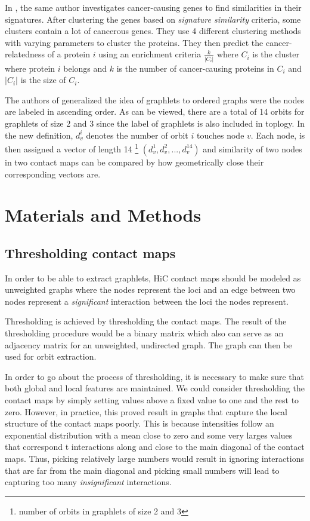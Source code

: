 \documentclass[a4,center,fleqn]{NAR}
\begin{document}
In \cite{milenkovic2010cancer}, the same author investigates 
cancer-causing genes to find similarities in their signatures. After
clustering the genes based on \textit{signature similarity} criteria,
some clusters contain a lot of cancerous genes.
They use 4 different clustering methods with varying parameters to cluster
the proteins. They then predict the cancer-relatedness of a protein 
$i$ using
an enrichment criteria $\frac{k}{|C_i|}$ where $C_i$ is the cluster
where protein $i$ belongs and $k$ is the number of cancer-causing
proteins in $C_i$ and $|C_i|$ is the size of $C_i$.


The authors of \cite{di2010fast} generalized the idea of graphlets to 
ordered graphs were the nodes are labeled in ascending order.
As can be viewed, there are a total of 14 orbits for graphlets of size
2 and 3 since the label of graphlets is also included in toplogy.
In the new definition, $d_v^i$ denotes the number of orbit $i$ touches 
node $v$. Each node, is then assigned a vector of length 14 
\footnote{number of orbits in graphlets of size 2 and 3}
$(d_v^1, d_v^2, ..., d_v^{14})$ 
and similarity of two nodes in two contact maps can be compared by
how geometrically close their corresponding vectors are.
\section{Materials and Methods}
\subsection{Thresholding contact maps}
In order to be able to extract graphlets, HiC contact maps should be modeled as
unweighted graphs where the nodes represent the loci and an edge between two 
nodes represent a \textit{significant} interaction between the loci the nodes
represent.

Thresholding is achieved by thresholding the contact maps. The result
of the thresholding procedure would be a binary matrix which also can serve as
an adjacency matrix for an unweighted, undirected graph. The graph can then be
used for orbit extraction.

In order to go about the process of thresholding, it is necessary to make sure
that both global and local features are maintained. We could consider 
thresholding the contact maps by simply setting values above a fixed value to
one and the rest to zero. However, in practice, this proved result in graphs
that capture the local structure of the contact maps poorly. This is because
intensities follow an exponential distribution with a mean close to zero and
some very larges values that correspond t interactions along and close to 
the main diagonal of the contact maps.
Thus, picking relatively large numbers would result in ignoring interactions
that are far from the main diagonal and picking small numbers will lead to
capturing too many \textit{insignificant} interactions.
\end{document}

